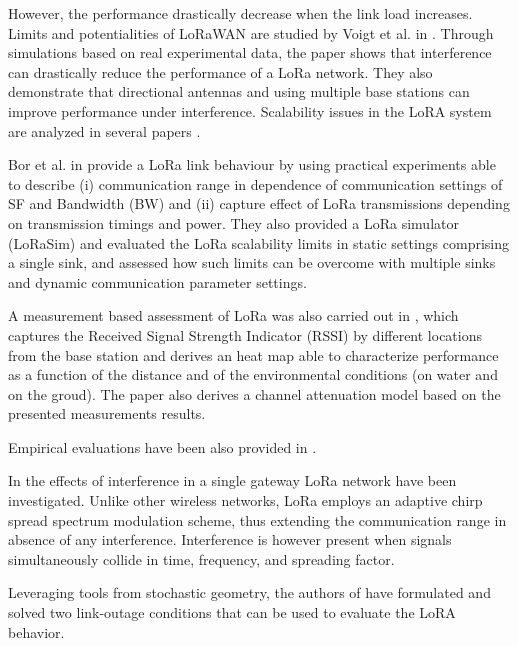 However,
	the performance drastically decrease when the link load increases.
Limits and potentialities of LoRaWAN are studied by Voigt et al.
in \cite{voigt_mitigating_2016}.
Through simulations based on real experimental data,
	the paper shows that interference can drastically reduce the performance of a LoRa network.
They also demonstrate that directional antennas and using multiple base stations can improve performance under interference.
Scalability issues in the LoRA system are analyzed in several papers \cite{bor_lora_2016}\cite{georgiou_low_2017}\cite{mikhaylov_analysis_2016}.


Bor et al.
in \cite{bor_lora_2016} provide a LoRa link behaviour by using practical experiments able to describe (i) communication range in dependence of communication settings of SF and Bandwidth (BW) and (ii) capture effect of LoRa transmissions depending on transmission timings and power.
They also provided a LoRa simulator (LoRaSim) and evaluated the LoRa scalability limits in static settings comprising a single sink,
	and assessed how such limits can be overcome with multiple sinks and dynamic communication parameter settings.

A measurement based assessment of LoRa was also carried out in \cite{petajajarvi_coverage_2015},
	which captures the Received Signal Strength Indicator (RSSI) by different locations from the base station and derives an heat map able to characterize performance as a function of the distance and of the environmental conditions (on water and on the groud).
The paper also derives a channel attenuation model based on the presented measurements results.

Empirical evaluations have been also provided in \cite{mikhaylov_lorawan_2017}.

In \cite{georgiou_low_2017} the effects of interference in a single gateway LoRa network have been investigated.
Unlike other wireless networks,
	LoRa employs an adaptive chirp spread spectrum modulation scheme,
	thus extending the communication range in absence of any interference.
Interference is however present when signals simultaneously collide in time,
	frequency,
	and spreading factor.

Leveraging tools from stochastic geometry,
	the authors of \cite{georgiou_low_2017} have formulated and solved two link-outage conditions that can be used to evaluate the LoRA behavior.

